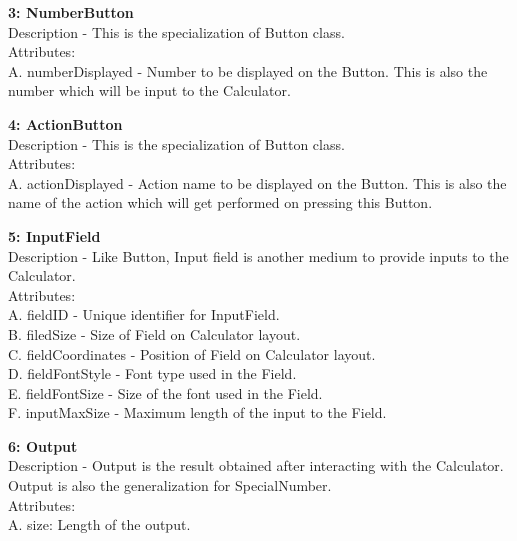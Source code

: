 \documentclass[paper=a4, fontsize=11pt]{report}
\numberwithin{equation}{section}		%
\numberwithin{figure}{section}			%
\numberwithin{table}{section}				%
\begin{document}
\begin{flushleft}
\textbf{3: NumberButton}
\\Description - This is the specialization of Button class.
\\Attributes:
\\A. numberDisplayed - Number to be displayed on the Button. This is also the number which will be input to the Calculator. 
\end{flushleft}

\begin{flushleft}
\textbf{4: ActionButton}
\\Description - This is the specialization of Button class.
\\Attributes:
\\A. actionDisplayed - Action name to be displayed on the Button. This is also the name of the action which will get performed on pressing this Button.
\end{flushleft}

\begin{flushleft}
\textbf{5: InputField}
\\Description - Like Button, Input field is another medium to provide inputs to the Calculator.
\\Attributes:
\\A. fieldID - Unique identifier for InputField.
\\B. filedSize - Size of Field on Calculator layout.
\\C. fieldCoordinates - Position of Field on Calculator layout.
\\D. fieldFontStyle - Font type used in the Field.
\\E. fieldFontSize - Size of the font used in the Field.
\\F. inputMaxSize - Maximum length of the input to the Field.
\end{flushleft}
\pagebreak

\begin{flushleft}
\textbf{6: Output   }
\\Description - Output is the result obtained after interacting with the Calculator. Output is also the generalization for SpecialNumber.
\\Attributes:
\\A. size: Length of the output.
\end{flushleft}
\end{document}
